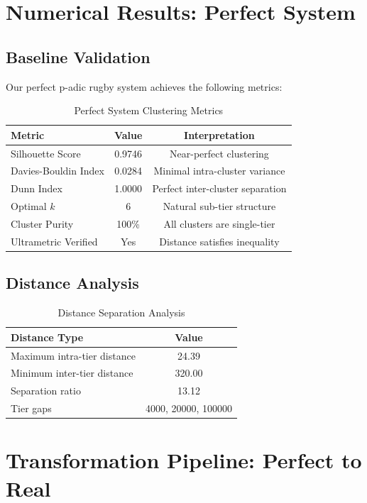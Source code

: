 \documentclass[11pt,a4paper]{article}
\begin{document}
\section{Numerical Results: Perfect System}

\subsection{Baseline Validation}

Our perfect p-adic rugby system achieves the following metrics:

\begin{table}[h]
\centering
\caption{Perfect System Clustering Metrics}
\begin{tabular}{lcc}
\toprule
\textbf{Metric} & \textbf{Value} & \textbf{Interpretation} \\
\midrule
Silhouette Score & 0.9746 & Near-perfect clustering \\
Davies-Bouldin Index & 0.0284 & Minimal intra-cluster variance \\
Dunn Index & 1.0000 & Perfect inter-cluster separation \\
Optimal $k$ & 6 & Natural sub-tier structure \\
Cluster Purity & 100\% & All clusters are single-tier \\
Ultrametric Verified & Yes & Distance satisfies inequality \\
\bottomrule
\end{tabular}
\end{table}

\subsection{Distance Analysis}

\begin{table}[h]
\centering
\caption{Distance Separation Analysis}
\begin{tabular}{lc}
\toprule
\textbf{Distance Type} & \textbf{Value} \\
\midrule
Maximum intra-tier distance & 24.39 \\
Minimum inter-tier distance & 320.00 \\
Separation ratio & 13.12 \\
Tier gaps & 4000, 20000, 100000 \\
\bottomrule
\end{tabular}
\end{table}

\section{Transformation Pipeline: Perfect to Real}
\end{document}
